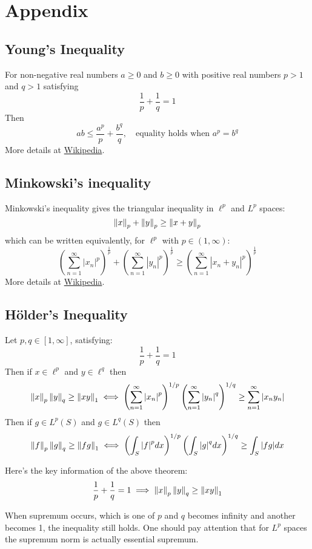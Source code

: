 \newpage
\section{Appendix}

\subsection{Young's Inequality}\label{Young's Inequality}\nextline
For non-negative real numbers $a\geq0$ and $b\geq0$ with positive real numbers $p>1$ and $q>1$ satisfying
$$
\frac{1}{p}+\frac{1}{q}=1
$$
Then 
$$
ab\leq \frac{a^p}{p}+\frac{b^q}{q},\quad \text{equality holds when }a^p=b^q
$$
More details at \href{https://en.wikipedia.org/wiki/Young's_inequality_for_products}{\color{blue} Wikipedia}.
\subsection{Minkowski's inequality}\label{Minkowski-holder}
Minkowski's inequality gives the triangular inequality in $\ell^p$ and $L^p$ spaces:
$$
\left\|{x}\right\|_p+\left\|{y}\right\|_p\geq\left\|{x+y}\right\|_p
$$
which can be written equivalently, for $\ell^p$ with $p\in(1,\infty)$:
$$
\left(\sum_{n=1}^{\infty}\left|x_n\right|^p\right)^\frac{1}{p}+
\left(\sum_{n=1}^{\infty}\left|y_n\right|^p\right)^\frac{1}{p}\geq
\left(\sum_{n=1}^{\infty}\left|x_n+y_n\right|^p\right)^\frac{1}{p}
$$
More details at \href{https://en.wikipedia.org/wiki/Minkowski_inequality}{\color{blue} Wikipedia}.

\subsection{Hölder's Inequality}\label{Hölder's inequality}
\begin{theorem}\rm\nextline
Let $p,q\in[1,\infty]$,	satisfying:
$$
\frac{1}{p}+\frac{1}{q}=1
$$
Then if $x\in\ell^p$ and $y\in\ell^q$ then 
$$
\left\|{x}\right\|_p\left\|{y}\right\|_q\geq\left\|{xy}\right\|_1
\iff
\left(\sum_{n=1}^\infty{|x_n|}^p\right)^{1/p}
\left(\sum_{n=1}^\infty{|y_n|}^q\right)^{1/q}\geq\sum_{n=1}^\infty|x_ny_n|
$$
Then if $g\in L^p(S)$ and $g\in L^q(S)$ then 
$$
\left\|{f}\right\|_p\left\|{g}\right\|_q\geq\left\|{fg}\right\|_1
\iff
\left(\int_S{|f|}^pdx\right)^{1/p}
\left(\int_S{|g|}^qdx\right)^{1/q}
\geq\int_S|fg|dx
$$
\end{theorem}
\begin{remark}\rm\nextline
Here's the key information of the above theorem:
$$
\frac{1}{p}+\frac{1}{q}=1\implies \left\|{x}\right\|_p\left\|{y}\right\|_q\geq\left\|{xy}\right\|_1
$$
\end{remark}
\begin{remark}\nl
When supremum occurs, which is  one of $p$ and $q$ becomes infinity and another becomes 1, the inequality still holds. One should pay attention that for $L^p$ spaces the supremum norm is actually essential supremum.
\end{remark}

